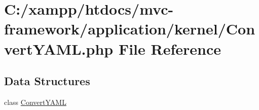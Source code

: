 \hypertarget{_convert_y_a_m_l_8php}{}\section{C\+:/xampp/htdocs/mvc-\/framework/application/kernel/\+Convert\+Y\+A\+M\+L.php File Reference}
\label{_convert_y_a_m_l_8php}
\subsection*{Data Structures}
\begin{DoxyCompactItemize}
\item 
class \hyperlink{class_convert_y_a_m_l}{Convert\+Y\+A\+M\+L}
\end{DoxyCompactItemize}
